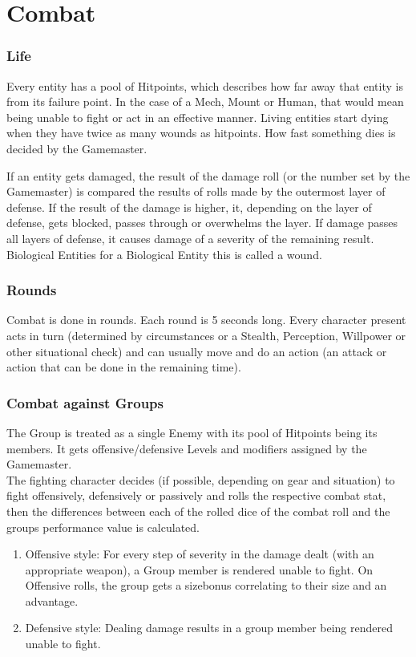 \chapter{Combat}\label{ch:combat}
\subsection{Life}\label{subsec:life}
Every entity has a pool of Hitpoints, which describes how far away that entity is from its failure point.
In the case of a Mech, Mount or Human, that would mean being unable to fight or act in an effective manner.
Living
entities start dying when they have twice as many wounds as hitpoints.
How fast something dies is decided by the
Gamemaster.\par
If an entity gets damaged, the result of the damage roll (or the number set by the Gamemaster) is compared the results
of rolls made by the outermost layer of defense.
If the result of the damage is higher, it, depending on the
layer of defense, gets blocked, passes through or overwhelms the layer.
If damage passes all layers of defense,
it causes damage of a severity of the remaining result.
Biological Entities for a Biological Entity this is called a wound.
\subsection{Rounds}
Combat is done in rounds.
Each round is 5 seconds long.
Every character present acts in turn (determined
by circumstances or a Stealth, Perception, Willpower or other situational check) and can usually move and do an action
(an attack or action that can be done in the remaining time).
\subsection{Combat against Groups}
The Group is treated as a single Enemy with its pool of Hitpoints being its members.
It gets offensive/defensive Levels and modifiers assigned by the Gamemaster.\\
The fighting character decides (if possible, depending on gear and situation) to fight offensively, defensively
or passively and rolls the respective combat stat, then the differences between each of the rolled dice of the combat
roll and the groups performance value is calculated.\par
\begin{enumerate}[label= - ]
    \item Offensive style: For every step of severity in the damage dealt (with an appropriate weapon),
    a Group member is rendered unable to
    fight.
    On Offensive rolls, the group gets a sizebonus correlating to their size and an advantage.
    \item Defensive style: Dealing damage results in a group member being rendered unable to fight.
\end{enumerate}

